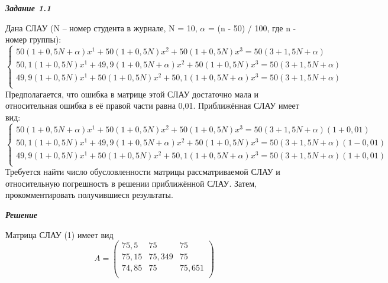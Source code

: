 \documentclass[12pt]{article}
\begin{document}
	\begin{center}
		\textbf{\textit{Задание 1.1}}
	\end{center}
	Дана СЛАУ (N – номер студента в журнале, N = 10, $\alpha$ = (n - 50) / 100, где n - номер группы):
	\begin{equation}
		\begin{cases}
			50(1 + 0,5N + \alpha)x^1 + 50(1 + 0,5N)x^2 + 50(1 + 0,5N)x^3 = 50(3 + 1,5N + \alpha)\\
			50,1(1 + 0,5N)x^1 + 49,9(1 + 0,5N + \alpha)x^2 + 50(1 + 0,5N)x^3 = 50(3 + 1,5N + \alpha)\\
			49,9(1 + 0,5N)x^1 + 50(1 + 0,5N)x^2 + 50,1(1 + 0,5N + \alpha)x^3 = 50(3 + 1,5N + \alpha)\\
		\end{cases}
	\end{equation}
	Предполагается, что ошибка в матрице этой СЛАУ достаточно мала и относительная
	ошибка в её правой части равна 0,01. Приближённая СЛАУ имеет вид:
	\begin{equation}
		\begin{cases}
		50(1 + 0,5N + \alpha)x^1 + 50(1 + 0,5N)x^2 + 50(1 + 0,5N)x^3 = 50(3 + 1,5N + \alpha)(1 + 0,01)\\
			50,1(1 + 0,5N)x^1 + 49,9(1 + 0,5N + \alpha)x^2 + 50(1 + 0,5N)x^3 = 50(3 + 1,5N + \alpha)(1 - 0,01)\\
			49,9(1 + 0,5N)x^1 + 50(1 + 0,5N)x^2 + 50,1(1 + 0,5N + \alpha)x^3 = 50(3 + 1,5N + \alpha)(1 + 0,01)\\
		\end{cases}
	\end{equation}
	Требуется найти число обусловленности матрицы рассматриваемой СЛАУ и
	относительную погрешность в решении приближённой СЛАУ. Затем, прокомментировать
	получившиеся результаты.
	\begin{center}
		\textbf{\textit{Решение}}
	\end{center}
	Матрица СЛАУ (1) имеет вид
	\begin{equation*}
		A = \left(
		\begin{array}{ccc}
			75,5 & 75 & 75\\
			75,15 & 75,349 & 75 \\
			74,85 & 75 & 75,651 \\
		\end{array}
		\right)
	\end{equation*}
\end{document}
